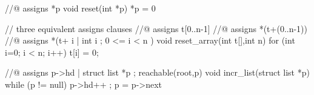\begin{c}
//@ assigns *p
void reset(int *p) { *p = 0 }

// three equivalent assigns clauses
//@ assigns t[0..n-1]
//@ assigns *(t+(0..n-1))
//@ assigns *(t+{ i | int i ; 0 <= i < n })
void reset_array(int t[],int n) { 
  for (int i=0; i < n; i++) t[i] = 0;
}

//@ assigns { p->hd | struct list *p ; reachable(root,p) }
void incr_list(struct list *p) {
  while (p != null) { p->hd++ ; p = p->next }
}
\end{c}

